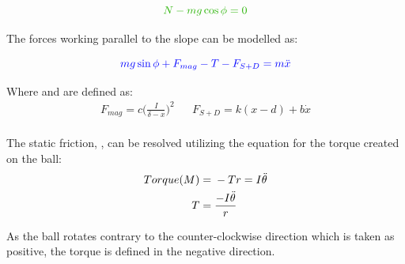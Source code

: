 \documentclass[a4paper,10pt,reqno]{amsart}
\numberwithin{equation}{section}
\begin{document}
\begin{equation}
    \color{darkGreen}{N-mg\cos{\phi}=0}\color{black}
\end{equation}

The forces working parallel to the slope can be modelled as:

\begin{equation}
\label{eqn:ForcesOrg}
    \color{blue}{mg\sin{\phi}+F_{mag}-T-F_{S+D}=m\ddot{x}}\color{black}
\end{equation}

Where  \color{black}and  \color{black}are defined as:
\begin{align*}
    F_{mag} = c\bigg(\frac{I}{\delta-x}\bigg)^2
    && F_{S+D}=k(x-d)+b\dot{x}\\
\end{align*}
\par The static friction, \color{blue}{$T$}\color{black}, can be resolved utilizing the equation for the torque created on the ball:
\begin{align}
    Torque(M)&{}={}-Tr=I\ddot{\theta}
    \notag\\
    T &= \frac{-I\ddot{\theta}}{r}
    \label{eqn:torque}
\end{align}
\par As the ball rotates contrary to the counter-clockwise direction which is taken as positive, the torque is defined in the negative direction. 
\end{document}
